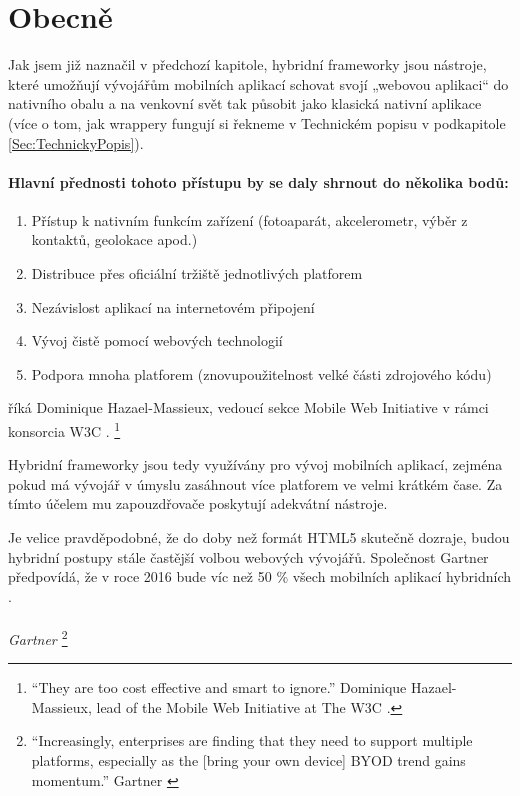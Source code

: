 \section{Obecně}
Jak jsem již naznačil v předchozí kapitole, hybridní frameworky jsou nástroje, které umožňují vývojářům mobilních aplikací schovat svojí „webovou aplikaci“ do nativního obalu a na venkovní svět tak působit jako klasická nativní aplikace (více o tom, jak wrappery fungují si řekneme v Technickém popisu v podkapitole \ref{Sec:TechnickyPopis}).

\paragraph{Hlavní přednosti tohoto přístupu by se daly shrnout do několika bodů:}
\begin{enumerate}
        \item Přístup k nativním funkcím zařízení (fotoaparát, akcelerometr, výběr z kontaktů, geolokace apod.)
        \item Distribuce přes oficiální tržiště jednotlivých platforem
        \item Nezávislost aplikací na internetovém připojení
        \item Vývoj čistě pomocí webových technologií
        \item Podpora mnoha platforem (znovupoužitelnost velké části zdrojového kódu)
\end{enumerate}

\textit{} říká Dominique Hazael-Massieux, vedoucí sekce Mobile Web Initiative v rámci konsorcia W3C \cite{bii_hybrid_apps_report}.
\footnote{“They are too cost effective and smart to ignore.” Dominique Hazael-Massieux, lead of the Mobile Web Initiative at The W3C \cite{bii_hybrid_apps_report}.}

Hybridní frameworky jsou tedy využívány pro vývoj mobilních aplikací, zejména pokud má vývojář v úmyslu zasáhnout více platforem ve velmi krátkém čase. Za tímto účelem mu zapouzdřovače poskytují adekvátní nástroje.

Je velice pravděpodobné, že do doby než formát HTML5 skutečně dozraje, budou hybridní postupy stále častější volbou webových vývojářů. Společnost Gartner předpovídá, že v roce 2016 bude víc než 50 \% všech mobilních aplikací hybridních \cite{gartner_says_50}.
\\ \\
\textit{ Gartner \cite{gartner_says_50}}
\footnote{“Increasingly, enterprises are finding that they need to support multiple platforms, especially as the [bring your own device] BYOD trend gains momentum.” Gartner \cite{gartner_says_50}}\\

